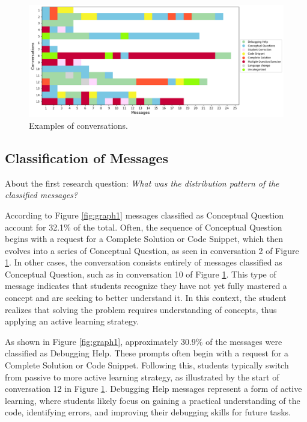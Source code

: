 \documentclass[a4paper,twoside]{article}
\begin{document}
\begin{figure}[htbp]
  \centering
  \includegraphics[scale=0.52]{img/figure2.png}
  \caption{Examples of conversations.}
  \label{fig:graph2}
\end{figure}

\subsection{Classification of Messages}

About the first research question: \textit{What was the distribution pattern of
the classified messages?}

According to Figure \ref{fig:graph1} messages classified as
Conceptual Question account for 32.1\% of the total. Often, the sequence of
Conceptual Question begins with a request for a Complete Solution or Code
Snippet, which then evolves into a series of Conceptual Question, as seen in
conversation 2 of Figure \ref{fig:graph2}. In other cases, the conversation
consists entirely of messages classified as Conceptual Question, such as in
conversation 10 of Figure \ref{fig:graph2}. This type of message indicates that
students recognize they have not yet fully mastered a concept and are seeking to
better understand it. In this context, the student realizes that solving the
problem requires understanding of concepts, thus applying an active learning
strategy.

As shown in Figure \ref{fig:graph1}, approximately 30.9\% of the messages were
classified as Debugging Help. These prompts often begin with a request for a
Complete Solution or Code Snippet. Following this, students typically switch from
passive to more active learning strategy, as illustrated by the start
of conversation 12 in Figure \ref{fig:graph2}. Debugging Help messages represent
a form of active learning, where students likely focus on gaining a practical
understanding of the code, identifying errors, and improving their debugging
skills for future tasks.
\end{document}
